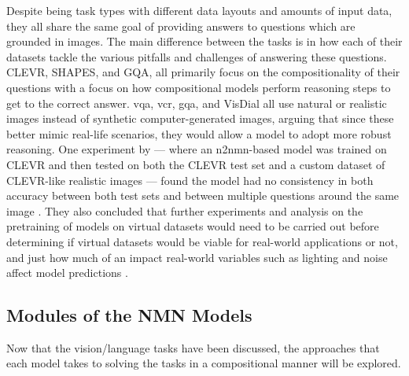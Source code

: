 Despite being task types with different data layouts and amounts of input data, they all share the same goal of providing answers to questions which are grounded in images.
The main difference between the tasks is in how each of their datasets tackle the various pitfalls and challenges of answering these questions.
CLEVR, SHAPES, and GQA, all primarily focus on the compositionality of their questions with a focus on how compositional models perform reasoning steps to get to the correct answer\cite{andreas_neural_2016,johnson_clevr_2016,hudson_gqa_2019}.
\gls{vqa}, \gls{vcr}, \gls{gqa}, and VisDial all use natural or realistic images instead of synthetic computer-generated images, arguing that since these better mimic real-life scenarios, they would allow a model to adopt more robust reasoning\cite{agrawal_vqa_2016,hudson_gqa_2019,zellers_recognition_2019,das_visual_2019}.
One experiment by \cite{sejnova_compositional_2018} --- where an \gls{n2nmn}-based model was trained on CLEVR and then tested on both the CLEVR test set and a custom dataset of CLEVR-like realistic images --- found the model had no consistency in both accuracy between both test sets and between multiple questions around the same image \cite{sejnova_compositional_2018}.
They also concluded that further experiments and analysis on the pretraining of models on virtual datasets would need to be carried out before determining if virtual datasets would be viable for real-world applications or not, and just how much of an impact real-world variables such as lighting and noise affect model predictions \cite{sejnova_compositional_2018}.

\subsection{Modules of the NMN Models}
\label{subsec:modules_of_the_nmn_models}

Now that the vision/language tasks have been discussed, the approaches that each model takes to solving the tasks in a compositional manner will be explored.

